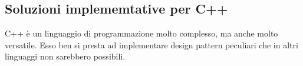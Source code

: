 \subsection{Soluzioni implememtative per C++}
C++ è un linguaggio di programmazione molto complesso, ma anche molto versatile. Esso ben si presta 
ad implementare design pattern peculiari che in altri linguaggi non sarebbero possibili.




